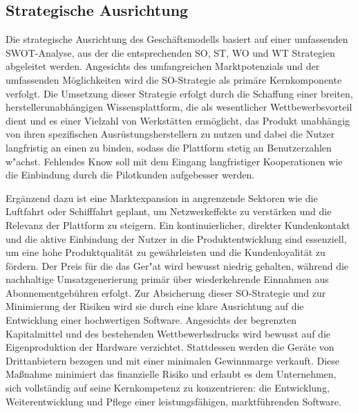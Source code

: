 \subsection{Strategische Ausrichtung}
Die strategische Ausrichtung des Geschäftsmodells basiert auf einer umfassenden SWOT-Analyse, aus der die entsprechenden SO, ST, WO und WT Strategien abgeleitet werden. Angesichts des umfangreichen Marktpotenzials und der umfassenden Möglichkeiten wird die SO-Strategie  als primäre Kernkomponente verfolgt. Die Umsetzung dieser Strategie erfolgt durch die Schaffung einer breiten, herstellerunabhängigen Wissensplattform, die als wesentlicher Wettbewerbsvorteil dient und es einer Vielzahl von Werkstätten ermöglicht, das Produkt unabhängig von ihren spezifischen Ausrüstungsherstellern zu nutzen und dabei die Nutzer langfristig an einen zu binden, sodass die Plattform stetig an Benutzerzahlen w"achst. Fehlendes Know soll mit dem Eingang langfristiger Kooperationen wie die Einbindung durch die Pilotkunden aufgebesser werden.


Ergänzend dazu ist eine Marktexpansion in angrenzende Sektoren wie die Luftfahrt oder Schifffahrt geplant, um Netzwerkeffekte zu verstärken und die Relevanz der Plattform zu steigern. Ein kontinuierlicher, direkter Kundenkontakt und die aktive Einbindung der Nutzer in die Produktentwicklung sind essenziell, um eine hohe Produktqualität zu gewährleisten und die Kundenloyalität zu fördern. Der Preis für die das Ger"at wird bewusst niedrig gehalten, während die nachhaltige Umsatzgenerierung primär über wiederkehrende Einnahmen aus Abonnementgebühren erfolgt.
Zur Absicherung dieser SO-Strategie und zur Minimierung der Risiken wird sie durch eine klare Ausrichtung auf die Entwicklung einer hochwertigen Software. Angesichts der begrenzten Kapitalmittel und des bestehenden Wettbewerbsdrucks wird bewusst auf die Eigenproduktion der Hardware verzichtet. Stattdessen werden die Geräte von Drittanbietern bezogen und mit einer minimalen Gewinnmarge verkauft. Diese Maßnahme minimiert das finanzielle Risiko und erlaubt es dem Unternehmen, sich vollständig auf seine Kernkompetenz zu konzentrieren: die Entwicklung, Weiterentwicklung und Pflege einer leistungsfähigen, marktführenden Software.


